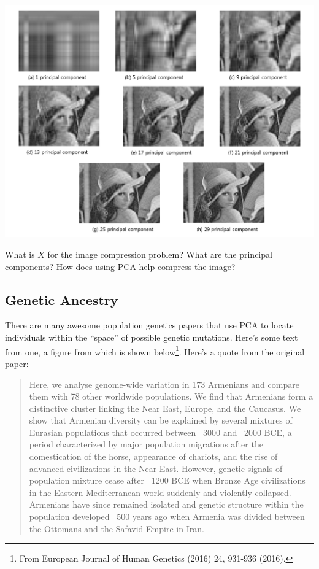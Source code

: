 \begin{center}
\includegraphics[width=\textwidth]{img/l04-compression.png}
\end{center}

\begin{question}{}
What is $X$ for the image compression problem? What are the principal components? How does using PCA help compress the image?
\end{question}

\subsection{Genetic Ancestry}

There are many awesome population genetics papers that use PCA to locate individuals within the ``space'' of possible genetic mutations. Here's some text from one, a figure from which is shown below\footnote{From European Journal of Human Genetics (2016) 24, 931-936 (2016).}. Here's a quote from the original paper:

\begin{quote}
Here, we analyse genome-wide variation in 173 Armenians and compare them with 78 other worldwide populations. We find that Armenians form a distinctive cluster linking the Near East, Europe, and the Caucasus. We show that Armenian diversity can be explained by several mixtures of Eurasian populations that occurred between ~3000 and ~2000 BCE, a period characterized by major population migrations after the domestication of the horse, appearance of chariots, and the rise of advanced civilizations in the Near East. However, genetic signals of population mixture cease after ~1200 BCE when Bronze Age civilizations in the Eastern Mediterranean world suddenly and violently collapsed. Armenians have since remained isolated and genetic structure within the population developed ~500 years ago when Armenia was divided between the Ottomans and the Safavid Empire in Iran. 
\end{quote}

